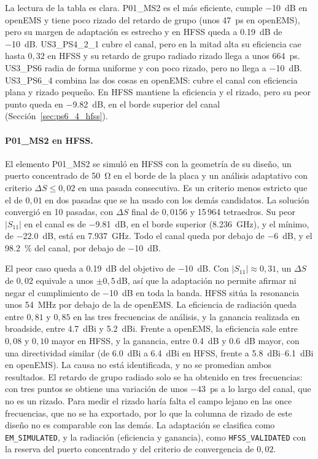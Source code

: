 \documentclass[11pt,a4paper]{article}
\begin{document}
La lectura de la tabla es clara. P01\_MS2 es el más eficiente, cumple \SI{-10}{dB} en openEMS y tiene poco rizado
del retardo de grupo (unos \SI{47}{ps} en openEMS), pero su margen de adaptación es estrecho y en HFSS queda a \SI{0.19}{dB} de \SI{-10}{dB}. US3\_PS4\_2\_1 cubre el canal, pero en la mitad
alta su eficiencia cae hasta $0{,}32$ en HFSS y su retardo de grupo radiado rizado llega a unos
\SI{664}{ps}. US3\_PS6 radia de forma uniforme y con poco rizado, pero no llega a \SI{-10}{dB}.
US3\_PS6\_4 combina las dos cosas en openEMS: cubre el canal con eficiencia plana y rizado pequeño. En HFSS mantiene la eficiencia y el rizado, pero su peor punto queda en \SI{-9.82}{dB}, en el borde superior del canal (Sección~\ref{sec:ps6_4_hfss}).

\paragraph{P01\_MS2 en HFSS.} El elemento P01\_MS2 se simuló en HFSS con la geometría de su diseño, un puerto concentrado de \SI{50}{\ohm} en el borde de la placa y un análisis adaptativo con criterio $\Delta S \le 0{,}02$ en una pasada consecutiva. Es un criterio menos estricto que el de $0{,}01$ en dos pasadas que se ha usado con los demás candidatos. La solución convergió en 10 pasadas, con $\Delta S$ final de $0{,}0156$ y 15\,964 tetraedros. Su peor $|S_{11}|$ en el canal es de \SI{-9.81}{dB}, en el borde superior (\SI{8.236}{GHz}), y el mínimo, de \SI{-22.0}{dB}, está en \SI{7.937}{GHz}. Todo el canal queda por debajo de \SI{-6}{dB}, y el \SI{98.2}{\percent} del canal, por debajo de \SI{-10}{dB}.

El peor caso queda a \SI{0.19}{dB} del objetivo de \SI{-10}{dB}. Con $|S_{11}| \approx 0{,}31$, un $\Delta S$ de $0{,}02$ equivale a unos $\pm 0{,}5$\,dB, así que la adaptación no permite afirmar ni negar el cumplimiento de \SI{-10}{dB} en toda la banda. HFSS sitúa la resonancia unos \SI{54}{MHz} por debajo de la de openEMS. La eficiencia de radiación queda entre $0{,}81$ y $0{,}85$ en las tres frecuencias de análisis, y la ganancia realizada en broadside, entre \SI{4.7}{dBi} y \SI{5.2}{dBi}. Frente a openEMS, la eficiencia sale entre $0{,}08$ y $0{,}10$ mayor en HFSS, y la ganancia, entre \SI{0.4}{dB} y \SI{0.6}{dB} mayor, con una directividad similar (de \SI{6.0}{dBi} a \SI{6.4}{dBi} en HFSS, frente a \SI{5.8}{dBi}--\SI{6.1}{dBi} en openEMS). La causa no está identificada, y no se promedian ambos resultados. El retardo de grupo radiado solo se ha obtenido en tres frecuencias: con tres puntos se obtiene una variación de unos \SI{-43}{ps} a lo largo del canal, que no es un rizado. Para medir el rizado haría falta el campo lejano en las once frecuencias, que no se ha exportado, por lo que la columna de rizado de este diseño no es comparable con las demás. La adaptación se clasifica como \texttt{EM\_SIMULATED}, y la radiación (eficiencia y ganancia), como \texttt{HFSS\_VALIDATED} con la reserva del puerto concentrado y del criterio de convergencia de $0{,}02$.
\end{document}
